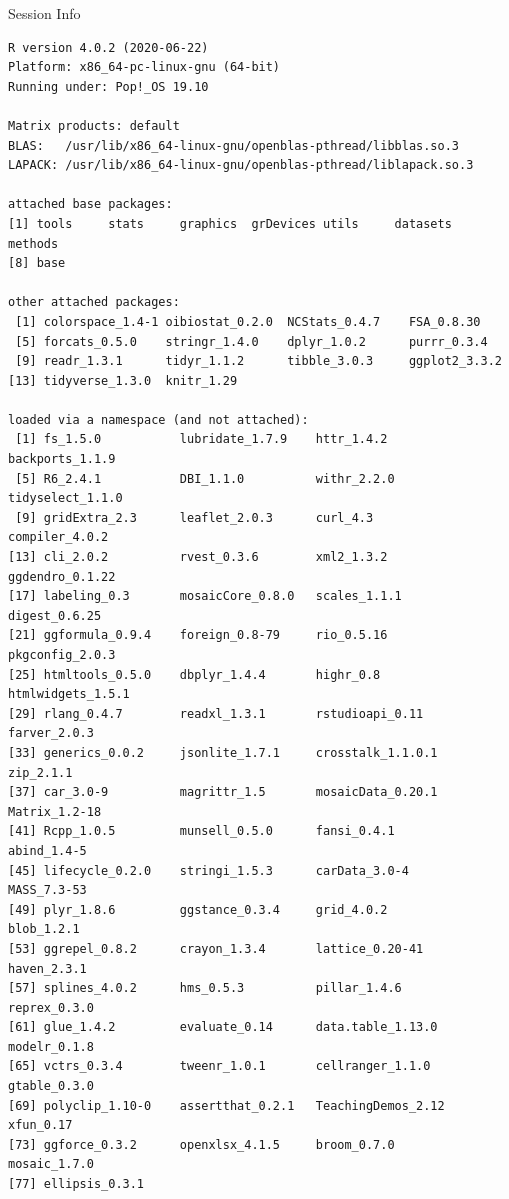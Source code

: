 \documentclass[10pt]{beamer}\usepackage[]{graphicx}\usepackage[]{color}
\makeatletter
\newenvironment{kframe}{%
 \def\at@end@of@kframe{}%
 \ifinner\ifhmode%
  \def\at@end@of@kframe{\end{minipage}}%
  \begin{minipage}{\columnwidth}%
 \fi\fi%
 \def\FrameCommand##1{\hskip\@totalleftmargin \hskip-\fboxsep
 \colorbox{shadecolor}{##1}\hskip-\fboxsep
     \hskip-\linewidth \hskip-\@totalleftmargin \hskip\columnwidth}%
 \MakeFramed {\advance\hsize-\width
   \@totalleftmargin\z@ \linewidth\hsize
   \@setminipage}}%
 {\par\unskip\endMakeFramed%
 \at@end@of@kframe}
\newenvironment{knitrout}{}{} %
\makeatother
\begin{document}
	
	\begin{frame}[fragile]{Session Info}
		\tiny
		
\begin{knitrout}\tiny
{}\color{fgcolor}\begin{kframe}
\begin{verbatim}
R version 4.0.2 (2020-06-22)
Platform: x86_64-pc-linux-gnu (64-bit)
Running under: Pop!_OS 19.10

Matrix products: default
BLAS:   /usr/lib/x86_64-linux-gnu/openblas-pthread/libblas.so.3
LAPACK: /usr/lib/x86_64-linux-gnu/openblas-pthread/liblapack.so.3

attached base packages:
[1] tools     stats     graphics  grDevices utils     datasets  methods  
[8] base     

other attached packages:
 [1] colorspace_1.4-1 oibiostat_0.2.0  NCStats_0.4.7    FSA_0.8.30      
 [5] forcats_0.5.0    stringr_1.4.0    dplyr_1.0.2      purrr_0.3.4     
 [9] readr_1.3.1      tidyr_1.1.2      tibble_3.0.3     ggplot2_3.3.2   
[13] tidyverse_1.3.0  knitr_1.29      

loaded via a namespace (and not attached):
 [1] fs_1.5.0           lubridate_1.7.9    httr_1.4.2         backports_1.1.9   
 [5] R6_2.4.1           DBI_1.1.0          withr_2.2.0        tidyselect_1.1.0  
 [9] gridExtra_2.3      leaflet_2.0.3      curl_4.3           compiler_4.0.2    
[13] cli_2.0.2          rvest_0.3.6        xml2_1.3.2         ggdendro_0.1.22   
[17] labeling_0.3       mosaicCore_0.8.0   scales_1.1.1       digest_0.6.25     
[21] ggformula_0.9.4    foreign_0.8-79     rio_0.5.16         pkgconfig_2.0.3   
[25] htmltools_0.5.0    dbplyr_1.4.4       highr_0.8          htmlwidgets_1.5.1 
[29] rlang_0.4.7        readxl_1.3.1       rstudioapi_0.11    farver_2.0.3      
[33] generics_0.0.2     jsonlite_1.7.1     crosstalk_1.1.0.1  zip_2.1.1         
[37] car_3.0-9          magrittr_1.5       mosaicData_0.20.1  Matrix_1.2-18     
[41] Rcpp_1.0.5         munsell_0.5.0      fansi_0.4.1        abind_1.4-5       
[45] lifecycle_0.2.0    stringi_1.5.3      carData_3.0-4      MASS_7.3-53       
[49] plyr_1.8.6         ggstance_0.3.4     grid_4.0.2         blob_1.2.1        
[53] ggrepel_0.8.2      crayon_1.3.4       lattice_0.20-41    haven_2.3.1       
[57] splines_4.0.2      hms_0.5.3          pillar_1.4.6       reprex_0.3.0      
[61] glue_1.4.2         evaluate_0.14      data.table_1.13.0  modelr_0.1.8      
[65] vctrs_0.3.4        tweenr_1.0.1       cellranger_1.1.0   gtable_0.3.0      
[69] polyclip_1.10-0    assertthat_0.2.1   TeachingDemos_2.12 xfun_0.17         
[73] ggforce_0.3.2      openxlsx_4.1.5     broom_0.7.0        mosaic_1.7.0      
[77] ellipsis_0.3.1    
\end{verbatim}
\end{kframe}
\end{knitrout}
		
	\end{frame}
	
\end{document}
